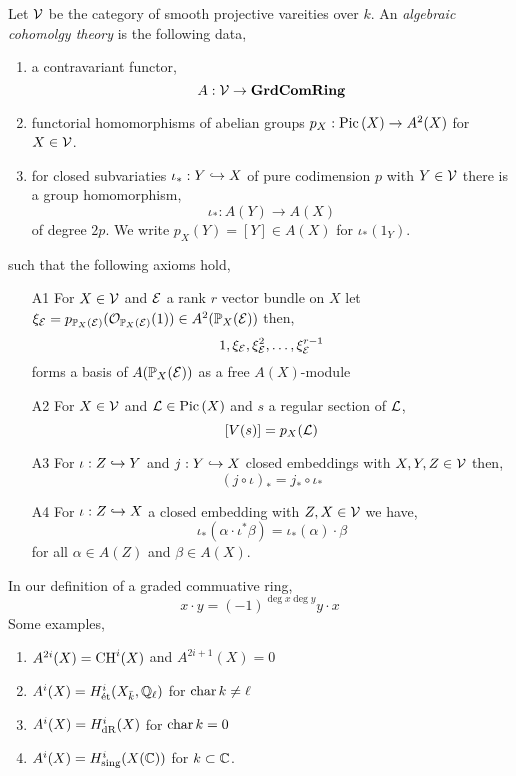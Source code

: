 \documentclass[12pt]{article}
\begin{document}
\begin{defn}
Let $\mathcal{V}$ be the category of smooth projective vareities over $k$. An \textit{algebraic cohomolgy theory} is the following data,
\begin{enumerate}
\item a contravariant functor,
\[ A : \mathcal{V} \to \mathbf{GrdComRing} \]

\item functorial homomorphisms of abelian groups $p_X : \mathrm{Pic} \left( X \right) \to A^2(X)$ for $X \in \mathcal{V}$. 

\item for closed subvariaties $\iota_* : Y \hookrightarrow X$ of pure codimension $p$ with $Y \in \mathcal{V}$ there is a group homomorphism,
\[ \iota_* : A(Y) \to A(X) \]
of degree $2p$. We write $p_X(Y) = [Y] \in A(X)$ for $\iota_*(1_Y)$.
\end{enumerate}
such that the following axioms hold,
\begin{enumerate}
\item[A1] For $X \in \mathcal{V}$ and $\mathcal{E}$ a rank $r$ vector bundle on $X$ let $\xi_{\mathcal{E}} = p_{\mathbb{P}_X(\mathcal{E})}(\mathcal{O}_{\mathbb{P}_X(\mathcal{E})}(1)) \in A^2(\mathbb{P}_X(\mathcal{E}))$ then, 
\[ 1, \xi_{\mathcal{E}}, \xi_{\mathcal{E}}^2, \dots, \xi_{\mathcal{E}}^{r-1} \]
forms a basis of $A(\mathbb{P}_X(\mathcal{E}))$ as a free $A(X)$-module

\item[A2] For $X \in \mathcal{V}$ and $\mathcal{L} \in \mathrm{Pic} \left( X \right)$ and $s$ a regular section of $\mathcal{L}$,
\[ [V(s)] = p_X(\mathcal{L}) \]

\item[A3] For $\iota : Z \hookrightarrow Y$ and $j : Y \hookrightarrow X$ closed embeddings with $X,Y,Z \in \mathcal{V}$ then,
\[ (j \circ \iota)_* = j_* \circ \iota_* \]

\item[A4] For $\iota : Z \hookrightarrow X$ a closed embedding with $Z, X \in \mathcal{V}$ we have,
\[ \iota_* (\alpha \cdot \iota^* \beta) = \iota_*(\alpha) \cdot \beta \]
for all $\alpha \in A(Z)$ and $\beta \in A(X)$.
\end{enumerate}
\end{defn}

\begin{rmk}
In our definition of a graded commuative ring,
\[ x \cdot y = (-1)^{\deg{x} \deg{y}} y \cdot x \]
Some examples,
\begin{enumerate}
\item $A^{2i}(X) = \mathrm{CH}^{i}(X)$ and $A^{2i+1}(X) = 0$
\item $A^i(X) = H_{\text{\'{e}t}}^i(X_{\bar{k}}, \mathbb{Q}_\ell)$ for $\operatorname{\mathrm{char}}{k} \neq \ell$
\item $A^i(X) = H_{\mathrm{dR}}^i(X)$ for $\operatorname{\mathrm{char}}{k} = 0$
\item $A^i(X) = H_{\text{sing}}^i(X(\mathbb{C}))$ for $k \subset \mathbb{C}$.
\end{enumerate}
\end{rmk}
\end{document}
